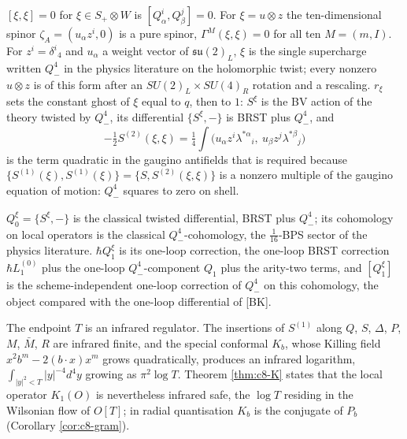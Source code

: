 \begin{remark}
$[\xi,\xi]=0$ for $\xi\in S_+\otimes W$ is $[Q^i_\alpha,Q^j_\beta]=0$. For $\xi=u\otimes z$ the ten-dimensional spinor $\zeta_A=(u_\alpha z^i,0)$ is a pure spinor, $\Gamma^M(\xi,\xi)=0$ for all ten $M=(m,I)$. For $z^i=\delta^i{}_4$ and $u_\alpha$ a weight vector of $\mathfrak{su}(2)_L$, $\xi$ is the single supercharge written $Q^4_-$ in the physics literature on the holomorphic twist; every nonzero $u\otimes z$ is of this form after an $SU(2)_L\times SU(4)_R$ rotation and a rescaling. $r_\xi$ sets the constant ghost of $\xi$ equal to $q$, then to $1$: $S^\xi$ is the BV action of the theory twisted by $Q^4_-$, its differential $\{S^\xi,-\}$ is BRST plus $Q^4_-$, and
\[
-\tfrac12S^{(2)}(\xi,\xi)=\tfrac14\int\big(u_\alpha z^i\lambda^{*\alpha}{}_i,\ u_\beta z^j\lambda^{*\beta}{}_j\big)
\]
is the term quadratic in the gaugino antifields that is required because $\{S^{(1)}(\xi),S^{(1)}(\xi)\}=\{S,S^{(2)}(\xi,\xi)\}$ is a nonzero multiple of the gaugino equation of motion: $Q^4_-$ squares to zero on shell.
\end{remark}

\begin{remark}
$Q^\xi_0=\{S^\xi,-\}$ is the classical twisted differential, BRST plus $Q^4_-$; its cohomology on local operators is the classical $Q^4_-$-cohomology, the $\tfrac1{16}$-BPS sector of the physics literature. $\hbar Q^\xi_1$ is its one-loop correction, the one-loop BRST correction $\hbar L_1^{(0)}$ plus the one-loop $Q^4_-$-component $Q_1$ plus the arity-two terms, and $[Q^\xi_1]$ is the scheme-independent one-loop correction of $Q^4_-$ on this cohomology, the object compared with the one-loop differential of [BK].
\end{remark}

\begin{remark}
The endpoint $T$ is an infrared regulator. The insertions of $S^{(1)}$ along $Q$, $S$, $\Delta$, $P$, $M$, $\bar M$, $R$ are infrared finite, and the special conformal $K_b$, whose Killing field $x^2b^m-2(b\cdot x)x^m$ grows quadratically, produces an infrared logarithm, $\int_{|y|^2<T}|y|^{-4}d^4y$ growing as $\pi^2\log T$. Theorem \ref{thm:c8-K} states that the local operator $K_1(O)$ is nevertheless infrared safe, the $\log T$ residing in the Wilsonian flow of $O[T]$; in radial quantisation $K_b$ is the conjugate of $P_b$ (Corollary \ref{cor:c8-gram}).
\end{remark}

